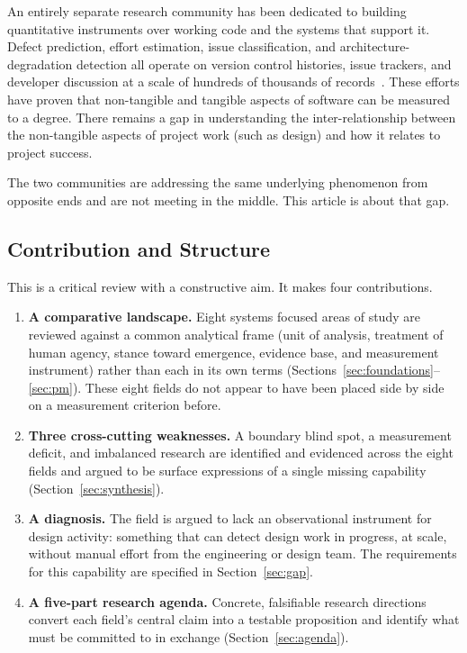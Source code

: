 \documentclass{csimq}
\begin{document}
An entirely separate research community has been dedicated to
building quantitative instruments over working code and the systems that support it. Defect prediction, effort estimation, issue classification, and
architecture-degradation detection all operate on version control histories,
issue trackers, and developer discussion at a scale of hundreds of thousands of
records~\cite{aleti2013,tawosi2022,zangari2023,herold2020}. These efforts have proven that non-tangible and tangible aspects of software can be measured to a degree. There remains a gap in understanding the inter-relationship between the non-tangible aspects of project work (such as design) and how it relates to project success.

The two communities are addressing the same underlying phenomenon from opposite
ends and are not meeting in the middle. This article is about that gap.

\subsection{Contribution and Structure}

This is a critical review with a constructive aim. It makes four contributions.

\begin{enumerate}
\item \textbf{A comparative landscape.} Eight systems focused areas of study are reviewed against a common analytical frame (unit of analysis,
treatment of human agency, stance toward emergence, evidence base, and
measurement instrument) rather than each in its own terms
(Sections~\ref{sec:foundations}--\ref{sec:pm}). These eight fields do not
appear to have been placed side by side on a measurement criterion before.

\item \textbf{Three cross-cutting weaknesses.} A boundary blind spot, a
measurement deficit, and imbalanced research are identified and evidenced
across the eight fields and argued to be surface expressions of a single
missing capability (Section~\ref{sec:synthesis}).

\item \textbf{A diagnosis.} The field is argued to lack an observational
instrument for design activity: something that can detect design work in
progress, at scale, without manual effort from the engineering or design team. The requirements
for this capability are specified in Section~\ref{sec:gap}.

\item \textbf{A five-part research agenda.} Concrete, falsifiable
research directions convert each field's central claim into a testable
proposition and identify what must be committed to in exchange (Section~\ref{sec:agenda}).
\end{enumerate}
\end{document}

